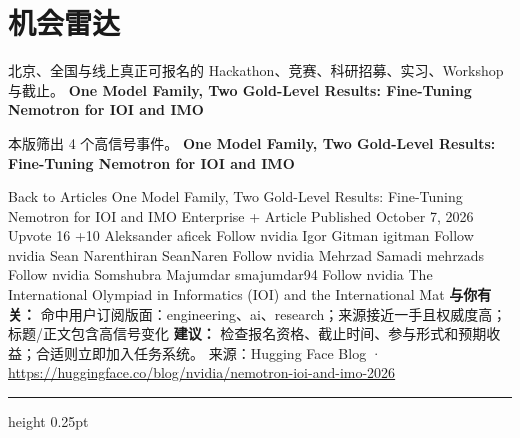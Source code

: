 \documentclass[10.5pt]{ctexart}
\begin{document}
\section*{机会雷达}
{\color{ormuted} 北京、全国与线上真正可报名的 Hackathon、竞赛、科研招募、实习、Workshop 与截止。}
\vspace{2mm}
{\LARGE\bfseries One Model Family, Two Gold-Level Results: Fine-Tuning Nemotron for IOI and IMO}\par
\vspace{1mm}
{\color{ormuted} 本版筛出 4 个高信号事件。}
\vspace{3mm}
{\Large\bfseries One Model Family, Two Gold-Level Results: Fine-Tuning Nemotron for IOI and IMO}\par
Back to Articles One Model Family, Two Gold-Level Results: Fine-Tuning Nemotron for IOI and IMO Enterprise + Article Published October 7, 2026 Upvote 16 +10 Aleksander aficek Follow nvidia Igor Gitman igitman Follow nvidia Sean Narenthiran SeanNaren Follow nvidia Mehrzad Samadi mehrzads Follow nvidia Somshubra Majumdar smajumdar94 Follow nvidia The International Olympiad in Informatics (IOI) and the International Mat
\textbf{与你有关：} 命中用户订阅版面：engineering、ai、research；来源接近一手且权威度高；标题/正文包含高信号变化
\textbf{建议：} 检查报名资格、截止时间、参与形式和预期收益；合适则立即加入任务系统。
{\footnotesize\color{ormuted} 来源：Hugging Face Blog · \url{https://huggingface.co/blog/nvidia/nemotron-ioi-and-imo-2026}}
\vspace{4mm}
\hrule height 0.25pt
\vspace{3mm}
\end{document}
